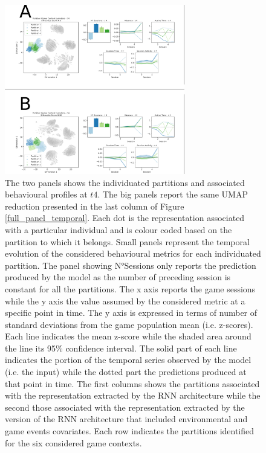 \begin{figure}[!htb]
\includegraphics[width=0.7\textwidth]{images/chapter_4/clust_beha.png}
\centering
\caption[\textbf{Partitions of the representations generated by the RNN architectures from the behavioural metrics}]{The two panels shows the individuated partitions and associated behavioural profiles at $t4$. The big panels report the same UMAP reduction presented in the last column of Figure \ref{full_panel_temporal}. Each dot is the representation associated with a particular individual and is colour coded based on the partition to which it belongs. Small panels represent the temporal evolution of the considered behavioural metrics for each individuated partition. The panel showing  N°Sessions only reports the prediction produced by the model as the number of preceding session is constant for all the partitions. The x axis reports the game sessions while the y axis the value assumed by the considered metric at a specific point in time. The y axis is expressed in terms of number of standard deviations from the game population mean (i.e. z-scores). Each line indicates the mean z-score while the shaded area around the line its 95\% confidence interval. The solid part of each line indicates the portion of the temporal series observed by the model (i.e. the input) while the dotted part the predictions produced at that point in time. The first columns shows the partitions associated with the representation extracted by the RNN architecture while the second those associated with the representation extracted by the version of the RNN architecture that included environmental and game events covariates. Each row indicates the partitions identified for the six considered game contexts.}
\label{partition_rnn_behaviour} 
\end{figure}

